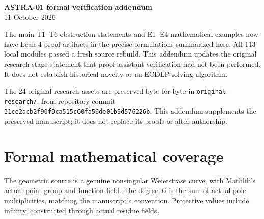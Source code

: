 \documentclass[11pt,a4paper]{article}
\begin{document}
\begin{center}
{\Large\bfseries ASTRA-01 formal verification addendum}\\[5pt]
11 October 2026
\end{center}

The main T1--T6 obstruction statements and E1--E4 mathematical examples now have Lean 4 proof artifacts in the precise formulations summarized here. All 113 local modules passed a fresh source rebuild. This addendum updates the original research-stage statement that proof-assistant verification had not been performed. It does not establish historical novelty or an ECDLP-solving algorithm.

The 24 original research assets are preserved byte-for-byte in \texttt{original-research/}, from repository commit \texttt{31ce2acb2f90f9ca515c60fa56de01b9d576226b}. This addendum supplements the preserved manuscript; it does not replace its proofs or alter authorship.

\section*{Formal mathematical coverage}
The geometric source is a genuine nonsingular Weierstrass curve, with Mathlib's actual point group and function field. The degree $D$ is the sum of actual pole multiplicities, matching the manuscript's convention. Projective values include infinity, constructed through actual residue fields.
\end{document}
